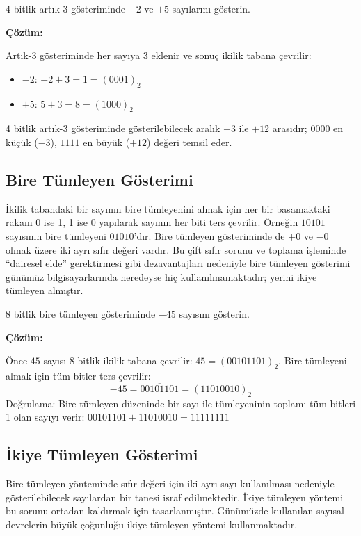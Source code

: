 \begin{ornek}[A.10]
4 bitlik artık-3 gösteriminde $-2$ ve $+5$ sayılarını gösterin.

\textbf{Çözüm:}

Artık-3 gösteriminde her sayıya 3 eklenir ve sonuç ikilik tabana çevrilir:
\begin{itemize}[nosep]
    \item $-2$: \;$-2 + 3 = 1 = (0001)_2$
    \item $+5$: \;$5 + 3 = 8 = (1000)_2$
\end{itemize}
4 bitlik artık-3 gösteriminde gösterilebilecek aralık $-3$ ile $+12$ arasıdır; $0000$ en küçük ($-3$), $1111$ en büyük ($+12$) değeri temsil eder.
\end{ornek}

\subsection{Bire Tümleyen Gösterimi}

İkilik tabandaki bir sayının bire tümleyenini almak için her bir basamaktaki rakam 0 ise 1, 1 ise 0 yapılarak sayının her biti ters çevrilir. Örneğin $10101$ sayısının bire tümleyeni $01010$'dır. Bire tümleyen gösteriminde de $+0$ ve $-0$ olmak üzere iki ayrı sıfır değeri vardır. Bu çift sıfır sorunu ve toplama işleminde ``dairesel elde'' gerektirmesi gibi dezavantajları nedeniyle bire tümleyen gösterimi günümüz bilgisayarlarında neredeyse hiç kullanılmamaktadır; yerini ikiye tümleyen almıştır.

\begin{ornek}[A.11]
8 bitlik bire tümleyen gösteriminde $-45$ sayısını gösterin.

\textbf{Çözüm:}

Önce $45$ sayısı 8 bitlik ikilik tabana çevrilir: $45 = (00101101)_2$. Bire tümleyeni almak için tüm bitler ters çevrilir:
\[
-45 = \overline{00101101} = (11010010)_2
\]
Doğrulama: Bire tümleyen düzeninde bir sayı ile tümleyeninin toplamı tüm bitleri 1 olan sayıyı verir: $00101101 + 11010010 = 11111111$ \checkmark
\end{ornek}

\subsection{İkiye Tümleyen Gösterimi}

Bire tümleyen yönteminde sıfır değeri için iki ayrı sayı kullanılması nedeniyle gösterilebilecek sayılardan bir tanesi israf edilmektedir. İkiye tümleyen yöntemi bu sorunu ortadan kaldırmak için tasarlanmıştır. Günümüzde kullanılan sayısal devrelerin büyük çoğunluğu ikiye tümleyen yöntemi kullanmaktadır.

